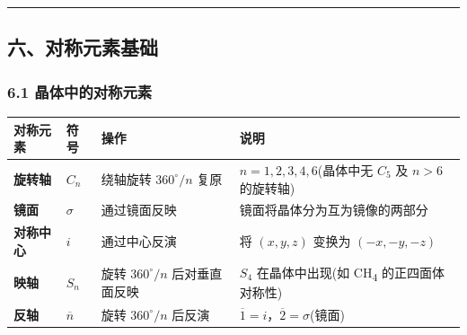 \documentclass[a4paper,11pt]{ctexart}
\newcounter{none}
\newcommand{\箭}{\ensuremath{\rightarrow}}
\newcommand{\左箭}{\ensuremath{\leftarrow}}
\newcommand{\上箭}{\ensuremath{\uparrow}}
\newcommand{\下箭}{\ensuremath{\downarrow}}
\newcommand{\衡}{\ensuremath{\rightleftharpoons}}
\newcommand{\双箭}{\ensuremath{\leftrightarrow}}
\newcommand{\约等于}{\ensuremath{\approx}}
\newcommand{\小于等于}{\ensuremath{\leq}}
\newcommand{\大于等于}{\ensuremath{\geq}}
\newcommand{\不等于}{\ensuremath{\neq}}
\newcommand{\西格马}{\ensuremath{\sigma}}
\newcommand{\派}{\ensuremath{\pi}}
\begin{document}
\begin{center}\rule{0.5\linewidth}{0.5pt}\end{center}

\subsection{六、对称元素基础}\label{ux516dux5bf9ux79f0ux5143ux7d20ux57faux7840}

\subsubsection{6.1 晶体中的对称元素}\label{ux6676ux4f53ux4e2dux7684ux5bf9ux79f0ux5143ux7d20}

{\def\LTcaptype{none} %
\begin{longtable}[]{@{}
  >{\centering\arraybackslash}p{}
  >{\centering\arraybackslash}p{}
  >{\raggedright\arraybackslash}p{}
  >{\raggedright\arraybackslash}p{}@{}}
\toprule\noalign{}
\begin{minipage}[b]{\linewidth}\centering
对称元素
\end{minipage} & \begin{minipage}[b]{\linewidth}\centering
符号
\end{minipage} & \begin{minipage}[b]{\linewidth}\raggedright
操作
\end{minipage} & \begin{minipage}[b]{\linewidth}\raggedright
说明
\end{minipage} \\
\midrule\noalign{}
\endhead
\bottomrule\noalign{}
\endlastfoot
\textbf{旋转轴} & \(C_n\) & 绕轴旋转 \(360^\circ/n\) 复原 & \(n = 1, 2, 3, 4, 6\)(晶体中无 \(C_5\) 及 \(n > 6\) 的旋转轴) \\
\textbf{镜面} & \(\sigma\) & 通过镜面反映 & 镜面将晶体分为互为镜像的两部分 \\
\textbf{对称中心} & \(i\) & 通过中心反演 & 将 \((x, y, z)\) 变换为 \((-x, -y, -z)\) \\
\textbf{映轴} & \(S_n\) & 旋转 \(360^\circ/n\) 后对垂直面反映 & \(S_4\) 在晶体中出现(如 CH\textsubscript{4} 的正四面体对称性) \\
\textbf{反轴} & \(\overline{n}\) & 旋转 \(360^\circ/n\) 后反演 & \(\overline{1} = i\)，\(\overline{2} = \sigma\)(镜面) \\
\end{longtable}
}
\end{document}

